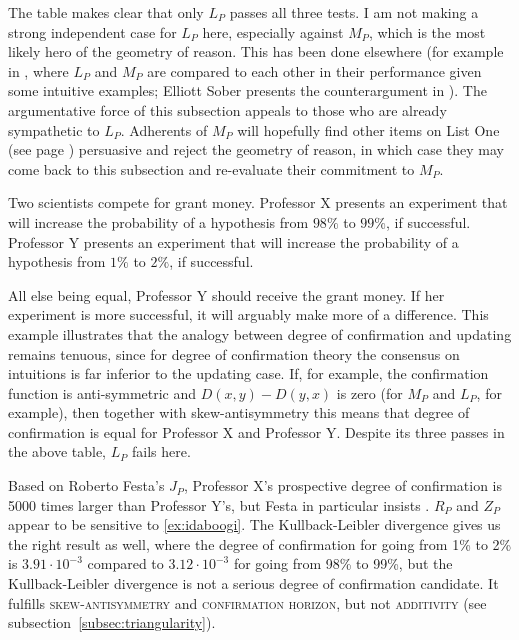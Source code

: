 \documentclass[phd,12pt,oneside]{ubcthesis}
\begin{document}
\medskip

The table makes clear that only $L_{P}$ passes all three tests. I am
not making a strong independent case for $L_{P}$ here, especially
against $M_{P}$, which is the most likely hero of the geometry of
reason. This has been done elsewhere (for example in
, where $L_{P}$ and $M_{P}$ are compared to
each other in their performance given some intuitive examples; Elliott
Sober presents the counterargument in ). The
argumentative force of this subsection appeals to those who are
already sympathetic to $L_{P}$. Adherents of $M_{P}$ will hopefully
find other items on List One (see page \pageref{page:listone})
persuasive and reject the geometry of reason, in which case they may
come back to this subsection and re-evaluate their commitment to
$M_{P}$.

\begin{quotex}
  \label{ex:idaboogi} Two scientists
  compete for grant money. Professor X presents an experiment that
  will increase the probability of a hypothesis from $98\%$ to $99\%$,
  if successful. Professor Y presents an experiment that will increase
  the probability of a hypothesis from $1\%$ to $2\%$, if successful.
\end{quotex}

All else being equal, Professor Y should receive the grant money. If
her experiment is more successful, it will arguably make more of a
difference. This example illustrates that the analogy between degree
of confirmation and updating remains tenuous, since for degree of
confirmation theory the consensus on intuitions is far inferior to the
updating case. If, for example, the confirmation function is
anti-symmetric and $D(x,y)-D(y,x)$ is zero (for $M_{P}$ and $L_{P}$,
for example), then together with skew-antisymmetry this means that
degree of confirmation is equal for Professor X and Professor Y.
Despite its three passes in the above table, $L_{P}$ fails here.

Based on Roberto Festa's $J_{P}$, Professor X's prospective degree of
confirmation is 5000 times larger than Professor Y's, but Festa in
particular insists 
. $R_{P}$ and $Z_{P}$ appear to be sensitive to
{\xample} \ref{ex:idaboogi}. The Kullback-Leibler divergence gives us
the right result as well, where the degree of confirmation for going
from 1\% to 2\% is $3.91\cdot{}10^{-3}$ compared to
$3.12\cdot{}10^{-3}$ for going from 98\% to 99\%, but the
Kullback-Leibler divergence is not a serious degree of confirmation
candidate. It fulfills \textsc{skew-antisymmetry} and
\textsc{confirmation horizon}, but not \textsc{additivity} (see
subsection~\ref{subsec:triangularity}).
\end{document}
